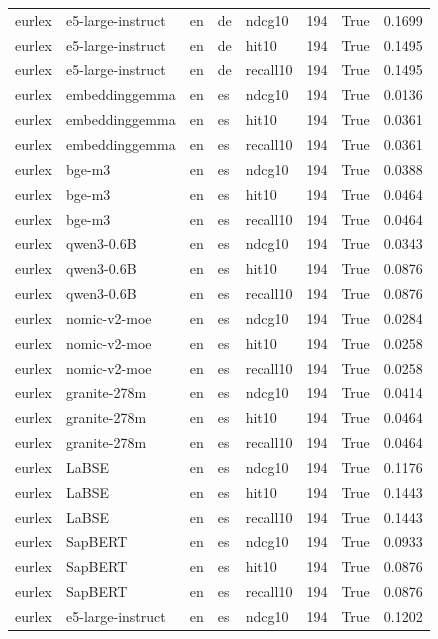 \begin{tabular}{lllllrrr}
eurlex & e5-large-instruct & en & de & ndcg10 & 194 & True & 0.1699 \\
eurlex & e5-large-instruct & en & de & hit10 & 194 & True & 0.1495 \\
eurlex & e5-large-instruct & en & de & recall10 & 194 & True & 0.1495 \\
eurlex & embeddinggemma & en & es & ndcg10 & 194 & True & 0.0136 \\
eurlex & embeddinggemma & en & es & hit10 & 194 & True & 0.0361 \\
eurlex & embeddinggemma & en & es & recall10 & 194 & True & 0.0361 \\
eurlex & bge-m3 & en & es & ndcg10 & 194 & True & 0.0388 \\
eurlex & bge-m3 & en & es & hit10 & 194 & True & 0.0464 \\
eurlex & bge-m3 & en & es & recall10 & 194 & True & 0.0464 \\
eurlex & qwen3-0.6B & en & es & ndcg10 & 194 & True & 0.0343 \\
eurlex & qwen3-0.6B & en & es & hit10 & 194 & True & 0.0876 \\
eurlex & qwen3-0.6B & en & es & recall10 & 194 & True & 0.0876 \\
eurlex & nomic-v2-moe & en & es & ndcg10 & 194 & True & 0.0284 \\
eurlex & nomic-v2-moe & en & es & hit10 & 194 & True & 0.0258 \\
eurlex & nomic-v2-moe & en & es & recall10 & 194 & True & 0.0258 \\
eurlex & granite-278m & en & es & ndcg10 & 194 & True & 0.0414 \\
eurlex & granite-278m & en & es & hit10 & 194 & True & 0.0464 \\
eurlex & granite-278m & en & es & recall10 & 194 & True & 0.0464 \\
eurlex & LaBSE & en & es & ndcg10 & 194 & True & 0.1176 \\
eurlex & LaBSE & en & es & hit10 & 194 & True & 0.1443 \\
eurlex & LaBSE & en & es & recall10 & 194 & True & 0.1443 \\
eurlex & SapBERT & en & es & ndcg10 & 194 & True & 0.0933 \\
eurlex & SapBERT & en & es & hit10 & 194 & True & 0.0876 \\
eurlex & SapBERT & en & es & recall10 & 194 & True & 0.0876 \\
eurlex & e5-large-instruct & en & es & ndcg10 & 194 & True & 0.1202 \\

\end{tabular}
